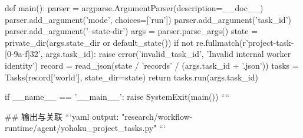 def main():
    parser = argparse.ArgumentParser(description=__doc__)
    parser.add_argument('mode', choices=['run'])
    parser.add_argument('task_id')
    parser.add_argument('--state-dir')
    args = parser.parse_args()
    state = private_dir(args.state_dir or default_state())
    if not re.fullmatch(r'project-task-[0-9a-f]{32}', args.task_id):
        raise error('invalid_task_id', 'Invalid internal worker identity')
    record = read_json(state / 'records' / (args.task_id + '.json'))
    tasks = Tasks(record['world'], state_dir=state)
    return tasks.run(args.task_id)


if __name__ == '__main__':
    raise SystemExit(main())
````

## 输出与关联
```yaml
output: "research/workflow-runtime/agent/yohaku_project_tasks.py"
```
